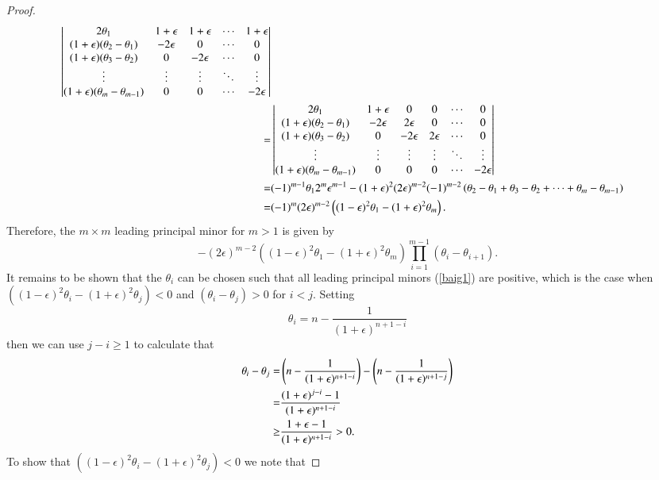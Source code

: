 \begin{proof}
\begin{align}
\begin{vmatrix}
2\theta_1 & 1+\epsilon&1+\epsilon&\cdots&1+\epsilon \\
(1+\epsilon)(\theta_2-\theta_1)&-2\epsilon&0&\cdots&0 \\
(1+\epsilon)(\theta_3-\theta_2)&0&-2\epsilon&\cdots&0 \\
\vdots&\vdots&\vdots&\ddots&\vdots \\
(1+\epsilon)(\theta_m-\theta_{m-1})&0&0&\cdots&-2\epsilon \end{vmatrix} \notag \\
=&\begin{vmatrix}
2\theta_1&1+\epsilon&0& 0&\cdots&0\\
(1+\epsilon)(\theta_2-\theta_1)&-2\epsilon&2\epsilon &0&\cdots&0\\
(1+\epsilon)(\theta_3-\theta_2)&0&-2\epsilon&2\epsilon&\cdots&0\\
\vdots&\vdots&\vdots&\vdots&\ddots&\vdots \\
(1+\epsilon)(\theta_m-\theta_{m-1})&0&0&0&\cdots&-2\epsilon\end{vmatrix}\notag \\
=&(-1)^{m-1}\theta_12^m\epsilon^{m-1} - (1+\epsilon)^2(2\epsilon)^{m-2}(-1)^{m-2}\left(\theta_2-\theta_1+\theta_3-\theta_2+\dots+\theta_m-\theta_{m-1}\right)\notag \\
=&(-1)^{m}(2\epsilon)^{m-2}\left( (1-\epsilon)^2\theta_1-(1+\epsilon)^2\theta_m\right). \notag
\end{align}
Therefore, the $m\times m$ leading principal minor for $m>1$ is given by
\begin{equation}
-(2\epsilon)^{m-2}\left( (1-\epsilon)^2\theta_1-(1+\epsilon)^2\theta_m\right)\prod_{i=1}^{m-1}(\theta_i-\theta_{i+1}). \label{baig1}
\end{equation}
It remains to be shown that the $\theta_i$ can be chosen such that all leading principal minors (\ref{baig1}) are positive, which is the case when $\left( (1-\epsilon)^2\theta_i-(1+\epsilon)^2\theta_j\right)<0$ and $(\theta_i-\theta_j)>0$ for $i<j$. Setting
\[
\theta_i=n-\frac{1}{(1+\epsilon)^{n+1-i}}
\]
then we can use $j-i\geq1$ to calculate that
\begin{align}
\theta_i-\theta_j=&\left(n-\frac{1}{(1+\epsilon)^{n+1-i}}\right)-\left(n-\frac{1}{(1+\epsilon)^{n+1-j}}\right) \notag \\
=&\frac{(1+\epsilon)^{j-i}-1}{(1+\epsilon)^{n+1-i}} \notag \\
\geq&\frac{1+\epsilon - 1}{(1+\epsilon)^{n+1-i}}>0. \notag
\end{align}
To show that $\left( (1-\epsilon)^2\theta_i-(1+\epsilon)^2\theta_j\right)<0$ we note that

\end{proof}
